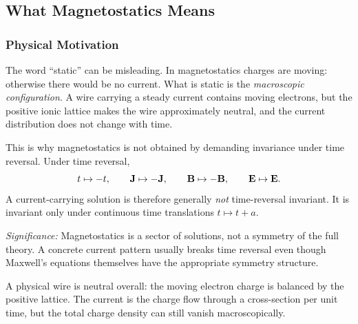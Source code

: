 \subsection{What Magnetostatics Means}\label{subsec:lec14-meaning}

\subsubsection*{Physical Motivation}
The word ``static'' can be misleading.  In magnetostatics charges are moving:
otherwise there would be no current.  What is static is the \emph{macroscopic
configuration}.  A wire carrying a steady current contains moving electrons, but
the positive ionic lattice makes the wire approximately neutral, and the current
distribution does not change with time.

This is why magnetostatics is not obtained by demanding invariance under time
reversal.  Under time reversal,
\begin{equation}\label{eq:lec14-time-reversal}
  t\mapsto -t,\qquad
  \mathbf{J}\mapsto -\mathbf{J},\qquad
  \mathbf{B}\mapsto -\mathbf{B},\qquad
  \mathbf{E}\mapsto \mathbf{E} .
\end{equation}
A current-carrying solution is therefore generally \emph{not} time-reversal
invariant.  It is invariant only under continuous time translations
$t\mapsto t+a$.


\textit{Significance:} Magnetostatics is a sector of solutions, not a symmetry of
the full theory.  A concrete current pattern usually breaks time reversal even though
Maxwell's equations themselves have the appropriate symmetry structure.

\begin{remark}
  A physical wire is neutral overall: the moving electron charge is balanced by the
  positive lattice.  The current is the charge flow through a cross-section per unit
  time, but the total charge density can still vanish macroscopically.
\end{remark}

